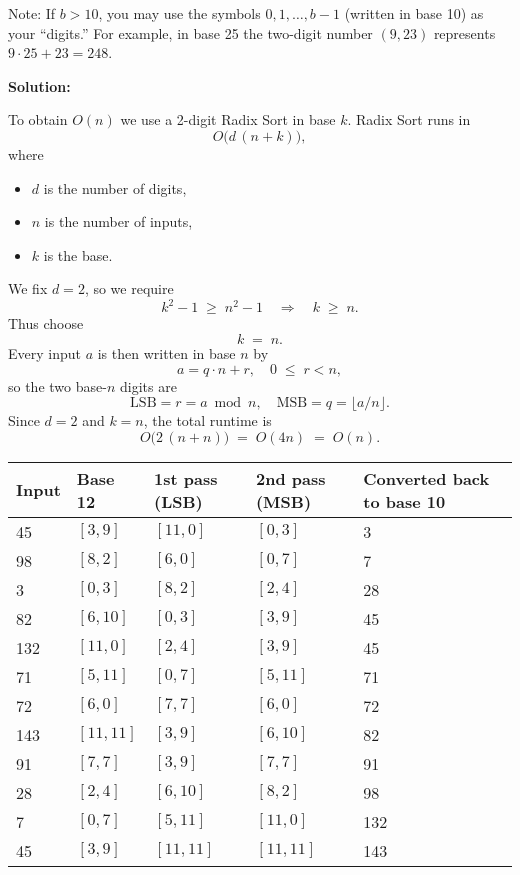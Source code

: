 \documentclass[11pt]{article}
\begin{document}
\bigskip
Note:  If $b>10$, you may use the symbols $0,1,\ldots,b-1$ (written in base 10) as your “digits.”  For example, in base 25 the two-digit number $(9,23)$ represents $9\cdot25 + 23 = 248$.

\bigskip
\textbf{Solution:}

To obtain $O(n)$ we use a 2-digit Radix Sort in base $k$.  Radix Sort runs in
\[
  O\bigl(d\,(n+k)\bigr),
\]
where
\begin{itemize}
  \item $d$ is the number of digits,
  \item $n$ is the number of inputs,
  \item $k$ is the base.
\end{itemize}
We fix $d=2$, so we require
\[
  k^2 - 1 \;\ge\; n^2 - 1
  \quad\Longrightarrow\quad
  k \;\ge\; n.
\]
Thus choose
\[
  k \;=\; n.
\]
Every input $a$ is then written in base $n$ by
\[
  a = q\cdot n + r,
  \quad
  0 \;\le\; r < n,
\]
so the two base-$n$ digits are
\[
  \text{LSB} = r = a \bmod n,
  \quad
  \text{MSB} = q = \bigl\lfloor a/n \bigr\rfloor.
\]
Since $d=2$ and $k=n$, the total runtime is
\[
  O\bigl(2\,(n + n)\bigr)
  \;=\;
  O(4n)
  \;=\;
  O(n).
\]

\newpage

\begin{center}
\begin{tabular}{|p{6em}|p{6em}|p{6em}|p{6em}|p{6em}|}
\hline
\textbf{Input} & \textbf{Base 12} & \textbf{1st pass (LSB)} & \textbf{2nd pass (MSB)} & \textbf{Converted back to base 10}\\
\hline
45   & $[3,9]$    & $[11,0]$  & $[0,3]$    & 3   \\
\hline
98   & $[8,2]$    & $[6,0]$   & $[0,7]$    & 7   \\
\hline
3    & $[0,3]$    & $[8,2]$   & $[2,4]$    & 28  \\
\hline
82   & $[6,10]$   & $[0,3]$   & $[3,9]$    & 45  \\
\hline
132  & $[11,0]$   & $[2,4]$   & $[3,9]$    & 45  \\
\hline
71   & $[5,11]$   & $[0,7]$   & $[5,11]$   & 71  \\
\hline
72   & $[6,0]$    & $[7,7]$   & $[6,0]$    & 72  \\
\hline
143  & $[11,11]$  & $[3,9]$   & $[6,10]$   & 82  \\
\hline
91   & $[7,7]$    & $[3,9]$   & $[7,7]$    & 91  \\
\hline
28   & $[2,4]$    & $[6,10]$  & $[8,2]$    & 98  \\
\hline
7    & $[0,7]$    & $[5,11]$  & $[11,0]$   & 132 \\
\hline
45   & $[3,9]$    & $[11,11]$ & $[11,11]$  & 143 \\
\hline
\end{tabular}
\end{center}
\end{document}
